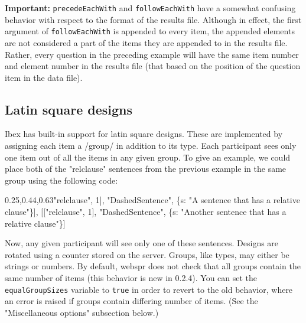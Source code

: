 \documentclass[
]{article}
\newenvironment{Shaded}{}{}
\newcommand{\DataTypeTok}[1]{\textcolor[rgb]{0.56,0.13,0.00}{#1}}
\newcommand{\DecValTok}[1]{\textcolor[rgb]{0.25,0.63,0.44}{#1}}
\newcommand{\NormalTok}[1]{#1}
\newcommand{\OperatorTok}[1]{\textcolor[rgb]{0.40,0.40,0.40}{#1}}
\newcommand{\StringTok}[1]{\textcolor[rgb]{0.25,0.44,0.63}{#1}}
\begin{document}
\textbf{Important:} \texttt{precedeEachWith} and \texttt{followEachWith}
have a somewhat confusing behavior with respect to the format of the
results file. Although in effect, the first argument of
\texttt{followEachWith} is appended to every item, the appended elements
are not considered a part of the items they are appended to in the
results file. Rather, every question in the preceding example will have
the same item number and element number in the results file (that based
on the position of the question item in the data file).

\hypertarget{latin-square-designs}{%
\subsection{Latin square designs}\label{latin-square-designs}}

Ibex has built-in support for latin square designs. These are
implemented by assigning each item a /group/ in addition to its type.
Each participant sees only one item out of all the items in any given
group. To give an example, we could place both of the "relclause"
sentences from the previous example in the same group using the
following code:

\begin{Shaded}
\begin{Highlighting}[]
\NormalTok{    [[}\StringTok{"relclause"}\OperatorTok{,} \DecValTok{1}\NormalTok{]}\OperatorTok{,} \StringTok{"DashedSentence"}\OperatorTok{,}\NormalTok{ \{}\DataTypeTok{s}\OperatorTok{:} \StringTok{"A sentence that has a relative clause"}\NormalTok{\}]}\OperatorTok{,}
\NormalTok{    [[}\StringTok{"relclause"}\OperatorTok{,} \DecValTok{1}\NormalTok{]}\OperatorTok{,} \StringTok{"DashedSentence"}\OperatorTok{,}\NormalTok{ \{}\DataTypeTok{s}\OperatorTok{:} \StringTok{"Another sentence that has a relative clause"}\NormalTok{\}]}
\end{Highlighting}
\end{Shaded}

Now, any given participant will see only one of these sentences. Designs
are rotated using a counter stored on the server. Groups, like types,
may either be strings or numbers. By default, webspr does not check that
all groups contain the same number of items (this behavior is new in
0.2.4). You can set the \texttt{equalGroupSizes} variable to
\texttt{true} in order to revert to the old behavior, where an error is
raised if groups contain differing number of items. (See the
"Miscellaneous options" subsection below.)
\end{document}
